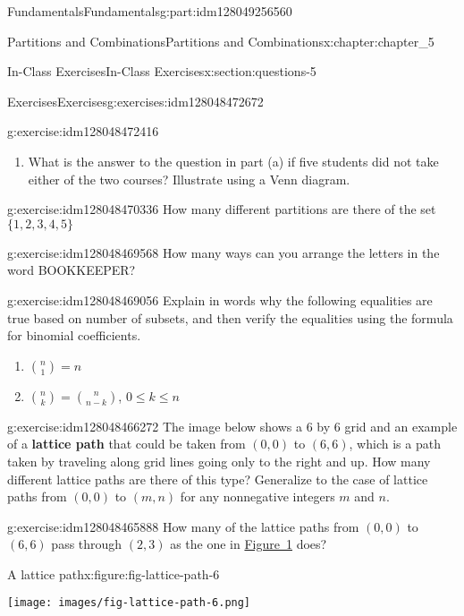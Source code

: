 \documentclass[oneside,10pt,]{book}
\newcommand{\terminology}[1]{\textbf{#1}}
\numberwithin{equation}{section}
\begin{document}
\begin{partptx}{Fundamentals}{}{Fundamentals}{}{}{g:part:idm128049256560}
\begin{chapterptx}{Partitions and Combinations}{}{Partitions and Combinations}{}{}{x:chapter:chapter_5}
\begin{sectionptx}{In-Class Exercises}{}{In-Class Exercises}{}{}{x:section:questions-5}
\begin{exercises-subsection}{Exercises}{}{Exercises}{}{}{g:exercises:idm128048472672}
\begin{exercisegroup}
\begin{divisionexerciseeg}{1}{}{}{g:exercise:idm128048472416}
\begin{enumerate}[label=(\alph*)]
\item{}What is the answer to the question in part (a) if five students did not take either of the two courses? Illustrate using a Venn diagram.%
\end{enumerate}
%
\end{divisionexerciseeg}%
\begin{divisionexerciseeg}{2}{}{}{g:exercise:idm128048470336}%
How many different partitions are there of the set \(\{1,2,3,4,5\}\)%
\end{divisionexerciseeg}%
\begin{divisionexerciseeg}{3}{}{}{g:exercise:idm128048469568}%
How many ways can you arrange the letters in the word BOOKKEEPER?%
\end{divisionexerciseeg}%
\begin{divisionexerciseeg}{4}{}{}{g:exercise:idm128048469056}%
Explain in words why the following equalities are true based on number of subsets,  and then verify the equalities using the formula for binomial coefficients.%
\par
%
\begin{enumerate}[label=(\alph*)]
\item{}\(\displaystyle \binom{n}{1} = n\)%
\item{}\(\binom{n}{k} = \binom{n}{n-k}\), \(0 \leq k \leq n\)%
\end{enumerate}
%
\end{divisionexerciseeg}%
\begin{divisionexerciseeg}{5}{}{}{g:exercise:idm128048466272}%
The image below shows a 6 by 6 grid and an example of a \terminology{lattice path} that could be taken from \((0,0)\)  to \((6,6)\), which is a path taken by traveling along grid lines going only to the right and up. How many different lattice paths are there of this type?  Generalize to the case of lattice paths from \((0,0)\) to \((m,n)\)  for any nonnegative integers \(m\) and \(n\).%
\end{divisionexerciseeg}%
\begin{divisionexerciseeg}{6}{}{}{g:exercise:idm128048465888}%
How many of the lattice paths from \((0,0)\) to \((6,6)\) pass through \((2,3)\) as the one in \hyperref[x:figure:fig-lattice-path-6]{Figure~1} does?%
\begin{figureptx}{A lattice path}{x:figure:fig-lattice-path-6}{}%
\begin{image}{0.25}{0.5}{0.25}%
\texttt{[image: images/fig-lattice-path-6.png]}
\end{image}%

\end{figureptx}
\end{divisionexerciseeg}
\end{exercisegroup}
\end{exercises-subsection}
\end{sectionptx}
\end{chapterptx}
\end{partptx}
\end{document}
